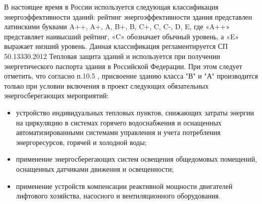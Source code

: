 В настоящее время в России используется следующая классификация энергоэффективности зданий:
рейтинг энергоэффективности здания представлен латинскими буквами A++, A+, A, B+, B, C+, C, C-, D, E, где «A++» представляет наивысший рейтинг,
«C» обозначает обычный уровень, а «E» выражает низший уровень.  Данная классификация регламентируется СП 50.13330.2012 Тепловая защита зданий \cite{law_RU_Rules_Code_ThermalPerformance}
и используется при получении энергетического паспорта здания в Российской Федерации. При этом следует отметить, что  согласно п.10.5 \cite{law_RU_Rules_Code_ThermalPerformance},
присвоение зданию класса "В" и "А" производится только при условии включения в проект следующих обязательных энергосберегающих мероприятий:
\begin{itemize}
    \item устройство индивидуальных тепловых пунктов, снижающих затраты энергии на циркуляцию в системах горячего водоснабжения и оснащенных автоматизированными системами управления и учета потребления энергоресурсов, горячей и холодной воды;
    \item применение энергосберегающих систем освещения общедомовых помещений, оснащенных датчиками движения и освещенности;
    \item применение устройств компенсации реактивной мощности двигателей лифтового хозяйства, насосного и вентиляционного оборудования.
\end{itemize}

